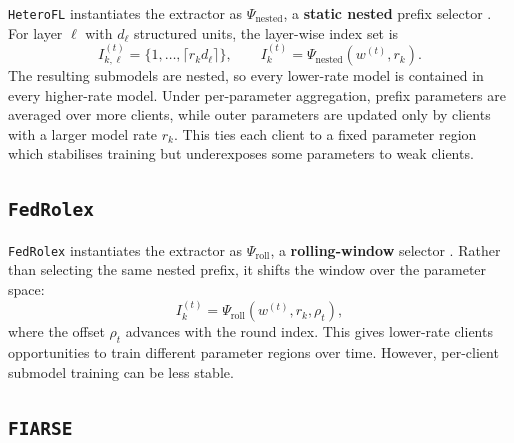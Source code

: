 \texttt{HeteroFL} instantiates the extractor as \(\Psi_{\mathrm{nested}}\), a \textbf{static nested} prefix selector \parencite{diao2021heterofl}. For layer \(\ell\) with \(d_\ell\) structured units, the layer-wise index set is
\[
    I_{k,\ell}^{(t)}
    =
    \{1,\dots,\lceil r_k d_\ell\rceil\},
    \qquad
    I_k^{(t)}=\Psi_{\mathrm{nested}}\!\left(w^{(t)}, r_k\right).
\]
The resulting submodels are nested, so every lower-rate model is contained in every higher-rate model. Under per-parameter aggregation, prefix parameters are averaged over more clients, while outer parameters are updated only by clients with a larger model rate \(r_k\). This ties each client to a fixed parameter region which stabilises training but underexposes some parameters to weak clients. 

\subsection{\texttt{FedRolex}}
\label{sec:fedrolex_related}

\texttt{FedRolex} instantiates the extractor as \(\Psi_{\mathrm{roll}}\), a \textbf{rolling-window} selector \parencite{alam2022fedrolex}. Rather than selecting the same nested prefix, it shifts the window over the parameter space:
\[
    I_k^{(t)}=\Psi_{\mathrm{roll}}\!\left(w^{(t)}, r_k, \rho_t\right),
\]
where the offset \(\rho_t\) advances with the round index. This gives lower-rate clients opportunities to train different parameter regions over time. However, per-client submodel training can be less stable.


\subsection{\texttt{FIARSE}}
\label{sec:fiarse_related}

